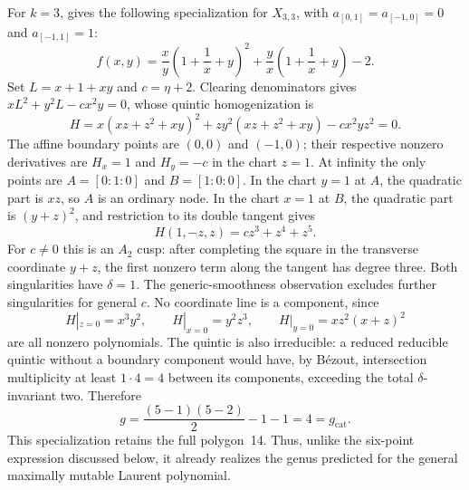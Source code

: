 \documentclass[11pt]{article}
\theoremstyle{plain}
\theoremstyle{definition}
\theoremstyle{remark}
\newcommand{\1}{\mathbf 1}
\begin{document}
For $k=3$, \cite[Section 7.5, entry 20, polygon 14]{OP} gives the following specialization for $X_{3,3}$, with $a_{[0,1]}=a_{[-1,0]}=0$ and $a_{[-1,1]}=1$:
\[
f(x,y)=\frac{x}{y}\left(1+\frac1x+y\right)^2
+\frac yx\left(1+\frac1x+y\right)-2.
\]
Set $L=x+1+xy$ and $c=\eta+2$.  Clearing denominators gives $xL^2+y^2L-cx^2y=0$, whose quintic homogenization is
\[
H=x(xz+z^2+xy)^2+zy^2(xz+z^2+xy)-cx^2yz^2=0.
\]
The affine boundary points are $(0,0)$ and $(-1,0)$; their respective nonzero derivatives are $H_x=1$ and $H_y=-c$ in the chart $z=1$.  At infinity the only points are $A=[0:1:0]$ and $B=[1:0:0]$.  In the chart $y=1$ at $A$, the quadratic part is $xz$, so $A$ is an ordinary node.  In the chart $x=1$ at $B$, the quadratic part is $(y+z)^2$, and restriction to its double tangent gives
\[
H(1,-z,z)=cz^3+z^4+z^5.
\]
For $c\ne0$ this is an $A_2$ cusp: after completing the square in the transverse coordinate $y+z$, the first nonzero term along the tangent has degree three.  Both singularities have $\delta=1$.  The generic-smoothness observation excludes further singularities for general $c$.  No coordinate line is a component, since
\[
H|_{z=0}=x^3y^2,\qquad H|_{x=0}=y^2z^3,\qquad
H|_{y=0}=xz^2(x+z)^2
\]
are all nonzero polynomials.  The quintic is also irreducible: a reduced reducible quintic without a boundary component would have, by B\'ezout, intersection multiplicity at least $1\cdot4=4$ between its components, exceeding the total $\delta$-invariant two.  Therefore
\[
g=\frac{(5-1)(5-2)}2-1-1=4=g_{\mathrm{cat}}.
\]
This specialization retains the full polygon~14.  Thus, unlike the six-point expression discussed below, it already realizes the genus predicted for the general maximally mutable Laurent polynomial.
\end{document}
